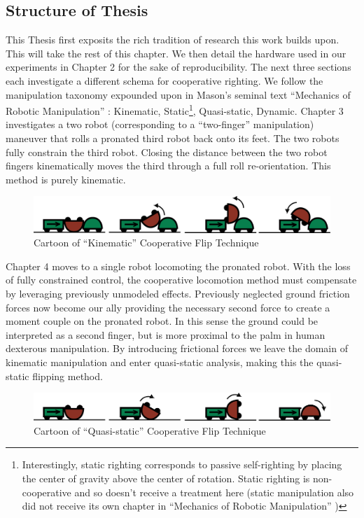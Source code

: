 \documentclass[letterpaper]{report}
\begin{document}
\subsection{Structure of Thesis}
This Thesis first exposits the rich tradition of research this work builds upon. This will take the rest of this chapter.
We then detail the hardware used in our experiments in Chapter 2 for the sake of reproducibility.
The next three sections each investigate a different schema for cooperative righting.
We follow the manipulation taxonomy expounded upon in Mason's seminal text ``Mechanics of Robotic Manipulation'' \cite{MasonMORMBook}: Kinematic, Static\footnote{Interestingly, static righting corresponds to passive self-righting by placing the center of gravity above the center of rotation. Static righting is non-cooperative and so doesn't receive a treatment here (static manipulation also did not receive its own chapter in ``Mechanics of Robotic Manipulation'' \cite{MasonMORMBook})}, Quasi-static, Dynamic.
Chapter 3 investigates a two robot (corresponding to a ``two-finger'' manipulation) maneuver that rolls a pronated third robot back onto its feet.
The two robots fully constrain the third robot. Closing the distance between the two robot fingers kinematically moves the third through a full roll re-orientation.
This method is purely kinematic.

\begin{figure}[ht]
\centering
\includegraphics[width=1.0\textwidth]{Kinematic_CoopCartoon.png}
\caption{Cartoon of ``Kinematic'' Cooperative Flip Technique}
\end{figure}

Chapter 4 moves to a single robot locomoting the pronated robot. With the loss of fully constrained control, the cooperative locomotion method must compensate by leveraging previously unmodeled effects.
Previously neglected ground friction forces now become our ally providing the necessary second force to create a moment couple on the pronated robot.
In this sense the ground could be interpreted as a second finger, but is more proximal to the palm in human dexterous manipulation.
By introducing frictional forces we leave the domain of kinematic manipulation and enter quasi-static analysis, making this the quasi-static flipping method.

\begin{figure}[ht]
\centering
\includegraphics[width=1.0\textwidth]{QuasiStatic_CoopCartoon.png}
\caption{Cartoon of ``Quasi-static'' Cooperative Flip Technique}
\end{figure}
\end{document}
